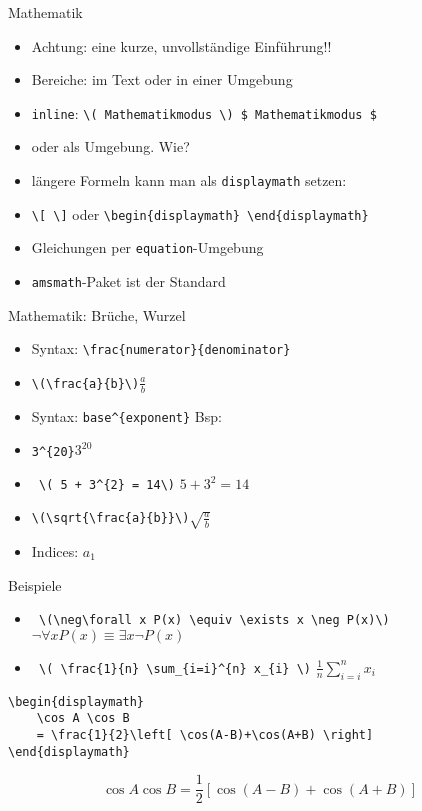 \begin{frame}[fragile]{Mathematik}
    \begin{itemize}[<+->]
        \item Achtung: eine kurze, unvollständige Einführung!!
        \item Bereiche: im Text oder in einer Umgebung
        \item \texttt{inline}: \lstinline|\( Mathematikmodus \) $ Mathematikmodus $ |
        \item oder als Umgebung. Wie?
        \item längere Formeln kann man als \texttt{displaymath} setzen:
        \item \lstinline|\[ \]| oder \lstinline|\begin{displaymath} \end{displaymath}|
        \item Gleichungen per \texttt{equation}-Umgebung
        \item \texttt{amsmath}-Paket ist der Standard
    \end{itemize}
\end{frame}

\begin{frame}[fragile]{Mathematik: Brüche, Wurzel}
    \begin{itemize}[<+->]
        \item Syntax: \lstinline|\frac{numerator}{denominator}|
        \item \lstinline|\(\frac{a}{b}\)|\is \(\frac{a}{b}\)
        \item Syntax: \lstinline|base^{exponent}| Bsp: \item \lstinline|3^{20}|\is \(3^{20}\)
        \item \lstinline| \( 5 + 3^{2} = 14\)|\is{} \( 5 + 3^{2} = 14\)
        \item \lstinline|\(\sqrt{\frac{a}{b}}\)|\is \(\sqrt{\frac{a}{b}}\)
        \item Indices: \(a_{1}\)
    \end{itemize}
\end{frame}

\begin{frame}[fragile]{Beispiele}
    \begin{itemize}[<+->]
        \item \lstinline| \(\neg\forall x P(x) \equiv \exists x \neg P(x)\)|\is \(\neg\forall x P(x) \equiv \exists x \neg P(x)\)
        \item \lstinline| \( \frac{1}{n} \sum_{i=i}^{n} x_{i} \)|\is{} \( \frac{1}{n} \sum_{i=i}^{n} x_{i} \)
    \end{itemize}
    \begin{lstlisting}
\begin{displaymath}
    \cos A \cos B
    = \frac{1}{2}\left[ \cos(A-B)+\cos(A+B) \right]
\end{displaymath}
\end{lstlisting}
\begin{displaymath}\cos A \cos B
    = \frac{1}{2}\left[ \cos(A-B)+\cos(A+B) \right]
\end{displaymath}
\end{frame}

